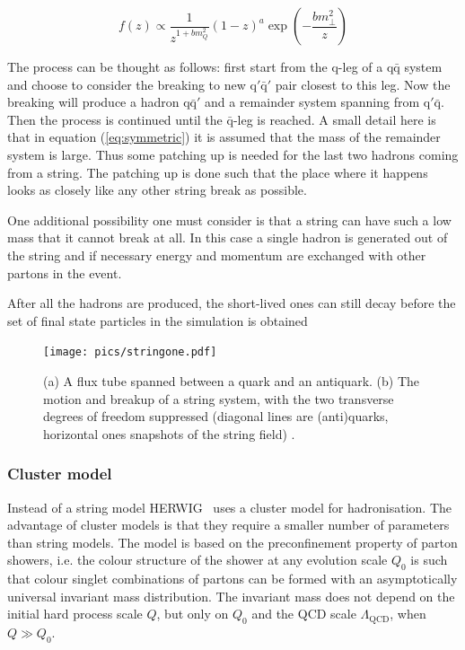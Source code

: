 \begin{equation}
f\left(z\right) \propto \frac{1}{z^{1+bm_Q^2}} \left(1-z\right)^a \exp \left(-\frac{b m_\perp ^2}{z} \right)
\label{eq:symmetric2}
\end{equation}

The process can be thought as follows: first start from the q-leg of a $\mathrm{q \bar{q}}$ system and choose to consider the breaking to new $\mathrm{q' \bar q'}$ pair closest to this leg. Now the breaking will produce a hadron $\mathrm{q \bar{q}'}$ and a remainder system spanning from $\mathrm{q' \bar{q}}$. Then the process is continued until the $\bar{\mathrm{q}}$-leg is reached. A small detail here is that in equation (\ref{eq:symmetric}) it is assumed that the mass of the remainder system is large. Thus some patching up is needed for the last two hadrons coming from a string. The patching up is done such that the place where it happens looks as closely like any other string break as possible.


One additional possibility one must consider is that a string can have such a low mass that it cannot break at all. In this case a single hadron is generated out of the string and if necessary  energy and momentum are exchanged with other partons in the event.

After all the hadrons are produced, the short-lived ones can still decay before the set of final state particles in the simulation is obtained~\cite{}
\begin{figure}
\centering
\texttt{[image: pics/stringone.pdf]}
\caption[]{ (a) A flux tube spanned between a quark and an antiquark. (b) The motion
and breakup of a string system, with the two transverse degrees of freedom suppressed
(diagonal lines are (anti)quarks, horizontal ones snapshots of the string field) \cite{eventGenerators}.
 }
\label{fig:fluxtube}
\end{figure}

\subsubsection*{Cluster model}
Instead of a string model HERWIG~\cite{herwigManual} uses a cluster model for hadronisation. The advantage of cluster models is that they require a smaller number of parameters than string models. The model is based on the preconfinement property of parton showers, i.e. the colour structure of the shower at any evolution scale $Q_0$ is such that colour singlet combinations of partons can be formed with an asymptotically 
universal invariant mass distribution. The invariant mass does not depend on the initial hard process scale $Q$, but only on $Q_0$ and the QCD scale $\Lambda _ \mathrm{QCD}$, when $Q \gg Q_0$.

